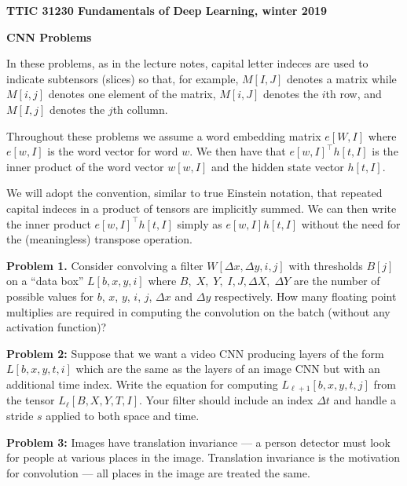 \documentclass{article}
\newcommand{\solution}[1]{}
\begin{document}
\centerline{\bf TTIC 31230 Fundamentals of Deep Learning, winter 2019}

\medskip
\centerline{\bf CNN Problems}

In these problems, as in the lecture notes, capital letter indeces are used to indicate subtensors (slices) so that, for example,  $M[I,J]$ denotes a matrix
while $M[i,j]$ denotes one element of the matrix, $M[i,J]$ denotes the $i$th row, and $M[I,j]$ denotes the $j$th collumn.

\medskip
Throughout these problems we assume a word embedding matrix $e[W,I]$ where $e[w,I]$ is the word vector for word $w$. We then have that $e[w,I]^\top h[t,I]$
is the inner product of the word vector $w[w,I]$ and the hidden state vector $h[t,I]$.

\medskip
We will adopt the convention, similar to true Einstein notation, that repeated capital indeces in a product of tensors are implicitly summed.  We can then write
the inner product $e[w,I]^\top h[t,I]$ simply as $e[w,I]h[t,I]$ without the need for the (meaningless) transpose operation.

\bigskip
{\bf Problem 1.}  Consider convolving a filter $W[\Delta x, \Delta y, i,j]$  with thresholds $B[j]$ on a ``data box'' $L[b,x,y,i]$ where $B,\;X,\;Y,\;I, J,\Delta X,\;\Delta Y$
are the number of possible values for $b$, $x$, $y$, $i$, $j$, $\Delta x$ and $\Delta y$ respectively.
How many floating point multiplies are required
in computing the convolution on the batch (without any activation function)?

\solution{$$BXY\;\Delta X\;\Delta Y \;IJ$$}

\bigskip
{\bf Problem 2:} Suppose that we want a video CNN producing layers of the form $L[b,x,y,t,i]$ which are the same as the layers of an image CNN but with an additional time index.
Write the equation for computing $L_{\ell+1}[b,x,y,t,j]$ from the tensor $L_\ell[B,X,Y,T,I]$.  Your filter should include an index $\Delta t$ and handle a stride $s$ applied
to both space and time.

\solution{
  $$L_{\ell + 1}[b,x,y,t,j] = \sum_{\Delta x, \Delta y, \Delta t, i} W[\Delta x, \Delta y, \Delta t, i, j] L_\ell[b, sx+ \Delta x, sy + \Delta y, st + \Delta t, i]$$
  }

\bigskip
{\bf Problem 3:} Images have translation invariance --- a person detector must look for people at various places in the image.  Translation invariance is the motivation for
convolution --- all places in the image are treated the same.
\end{document}
